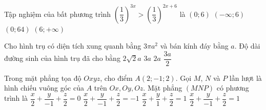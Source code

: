 \begin{ex}%
	Tập nghiệm của bất phương trình ${{\left(\dfrac{1}{3}\right)}^{3x}}>{{\left(\dfrac{1}{3}\right)}^{2x + 6}}$ là
	\choice
	{$\left(0; 6\right)$}
	{\True $\left(- \infty; 6\right)$}
	{$\left(0; 64\right)$}
	{$\left(6; + \infty\right)$}
\end{ex}
\begin{ex}%
	Cho hình trụ có diện tích xung quanh bằng $3\pi a^2$ và bán kính đáy bằng $a$. Độ dài đường sinh của hình trụ đã cho bằng
	\choice
	{$2\sqrt{2}a$}
	{$3a$}
	{$2a$}
	{\True $\dfrac{3a}{2}$}
\end{ex}
\begin{ex}%
	Trong mặt phẳng tọa độ $Oxyz$, cho điểm $A\left(2; - 1; 2\right)$. Gọi $M$, $N$ và $P$ lần lượt là hình chiếu vuông góc của $A$ trên $Ox, Oy, Oz$. Mặt phẳng $\left( MNP \right)$ có phương trình là
	\choice
	{$\dfrac{x}{2} + \dfrac{y}{- 1} + \dfrac{z}{2}=0$}
	{$\dfrac{x}{2} + \dfrac{y}{- 1} + \dfrac{z}{2}= - 1$}
	{$\dfrac{x}{2} + \dfrac{y}{1} + \dfrac{z}{2}=1$}
	{\True $\dfrac{x}{2} + \dfrac{y}{- 1} + \dfrac{z}{2}=1$}
\end{ex}

